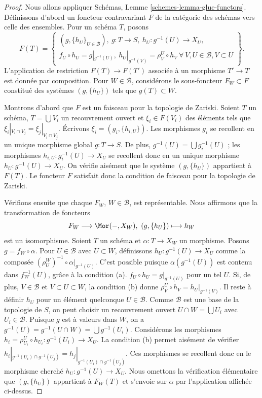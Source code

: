 \begin{proof}
Nous allons appliquer Schémas, Lemme
\ref{schemes-lemma-glue-functors}.
Définissons d'abord un foncteur contravariant $F$ de la catégorie des
schémas vers celle des ensembles. Pour un schéma $T$, posons
$$
F(T) =
\left\{
\begin{matrix}
(g, \{h_U\}_{U \in \mathcal{B}}),
\ g : T \to S, \ h_U : g^{-1}(U) \to X_U, \\
f_U \circ h_U = g|_{g^{-1}(U)},
\ h_U|_{g^{-1}(V)} = \rho^U_V \circ h_V
\ \forall\ V, U \in \mathcal{B}, V \subset U
\end{matrix}
\right\}.
$$
L'application de restriction $F(T) \to F(T')$ associée à un morphisme
$T' \to T$ est donnée par composition. Pour $W \in \mathcal{B}$,
considérons le sous-foncteur $F_W \subset F$ constitué des systèmes
$(g, \{h_U\})$ tels que $g(T) \subset W$.

\medskip\noindent
Montrons d'abord que $F$ est un faisceau pour la topologie de Zariski.
Soient $T$ un schéma, $T = \bigcup V_i$ un recouvrement ouvert et
$\xi_i \in F(V_i)$ des éléments tels que
$\xi_i|_{V_i \cap V_j} = \xi_j|_{V_i \cap V_j}$.
Écrivons $\xi_i = (g_i, \{h_{i, U}\})$.
Les morphismes $g_i$ se recollent en un unique morphisme global
$g : T \to S$. De plus,
$g^{-1}(U) = \bigcup g_i^{-1}(U)$ ; les morphismes
$h_{i, U} : g_i^{-1}(U) \to X_U$ se recollent donc en un unique morphisme
$h_U : g^{-1}(U) \to X_U$. On vérifie aisément que le système
$(g, \{h_U\})$ appartient à $F(T)$. Le foncteur $F$ satisfait donc la
condition de faisceau pour la topologie de Zariski.

\medskip\noindent
Vérifions ensuite que chaque $F_W$,
$W \in \mathcal{B}$, est représentable.
Nous affirmons que la transformation de foncteurs
$$
F_W \longrightarrow \Mor(-, X_W), \ (g, \{h_U\}) \longmapsto h_W
$$
est un isomorphisme. Soient $T$ un schéma et $\alpha : T \to X_W$ un
morphisme. Posons $g = f_W \circ \alpha$.
Pour $U \in \mathcal{B}$ avec $U \subset W$, définissons
$h_U : g^{-1}(U) \to X_U$ comme la composée
$(\rho^W_U)^{-1} \circ \alpha|_{g^{-1}(U)}$.
C'est possible puisque $\alpha(g^{-1}(U))$ est contenu dans $f_W^{-1}(U)$,
grâce à la condition (a).
$f_U \circ h_U = g|_{g^{-1}(U)}$ pour un tel $U$.
Si, de plus, $V \in \mathcal{B}$ et $V \subset U \subset W$, la condition
(b) donne $\rho^U_V \circ h_V = h_U|_{g^{-1}(V)}$.
Il reste à définir $h_U$ pour un élément quelconque $U \in \mathcal{B}$.
Comme $\mathcal{B}$ est une base de la topologie de $S$, on peut choisir
un recouvrement ouvert $U \cap W = \bigcup U_i$
avec $U_i \in \mathcal{B}$.
Puisque $g$ est à valeurs dans $W$, on a
$g^{-1}(U) = g^{-1}(U \cap W) = \bigcup g^{-1}(U_i)$.
Considérons les morphismes
$h_i = \rho^U_{U_i} \circ h_{U_i} : g^{-1}(U_i) \to X_U$.
La condition (b) permet aisément de vérifier
$h_i|_{g^{-1}(U_i) \cap g^{-1}(U_j)} = h_j|_{g^{-1}(U_i) \cap g^{-1}(U_j)}$.
Ces morphismes se recollent donc en le morphisme cherché
$h_U : g^{-1}(U) \to X_U$. Nous omettons la vérification élémentaire que
$(g, \{h_U\})$ appartient à $F_W(T)$ et s'envoie sur $\alpha$ par
l'application affichée ci-dessus.


\end{proof}
